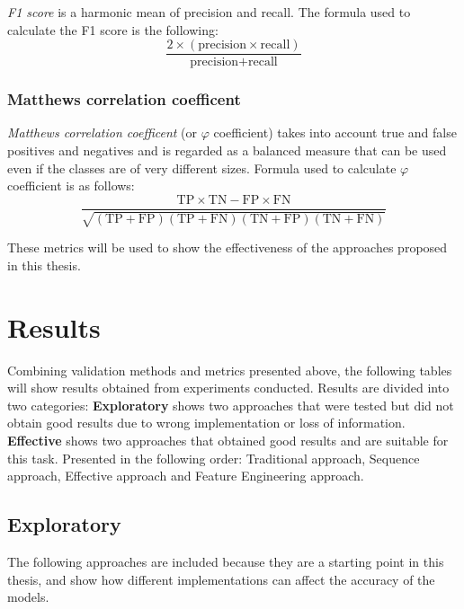                 \textit{F1 score} is a harmonic mean of precision and recall. The formula used to calculate the F1 score is the following:
                \begin{equation}
                    \frac{ 2 \times (\text{precision} \times \text{recall})}{\text{precision} + \text{recall}}
                \end{equation}

            \subsubsection{Matthews correlation coefficent} 

                \textit{Matthews correlation coefficent} (or $\varphi$ coefficient) takes into account true and false positives and negatives and is regarded as a balanced measure that can be used even if the classes are of very different sizes. Formula used to calculate $\varphi$ coefficient is as follows: 
                \begin{equation}
                    \frac{\text{TP} \times \text{TN} - \text{FP} \times \text{FN}}{\sqrt{(\text{TP} + \text{FP})(\text{TP} + \text{FN})(\text{TN} + \text{FP})(\text{TN} + \text{FN})}}
                \end{equation}

            These metrics will be used to show the effectiveness of the approaches proposed in this thesis.
    
\section{Results}
        
        Combining validation methods and metrics presented above, the following tables will show results obtained from experiments conducted. Results are divided into two categories: \textbf{Exploratory} shows two approaches that were tested but did not obtain good results due to wrong implementation or loss of information. \textbf{Effective} shows two approaches that obtained good results and are suitable for this task. Presented in the following order: Traditional approach, Sequence approach, Effective approach and Feature Engineering approach. 

        \subsection{Exploratory}

            The following approaches are included because they are a starting point in this thesis, and show how different implementations can affect the accuracy of the models.
            
